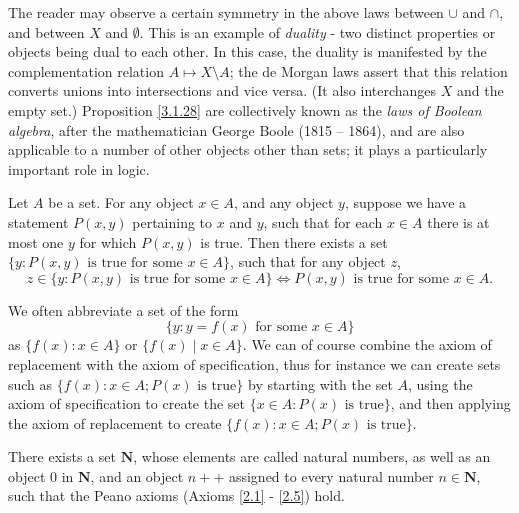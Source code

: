 \begin{remark}\label{3.1.30}
The reader may observe a certain symmetry in the above laws between \(\cup\) and \(\cap\), and between \(X\) and \(\emptyset\).
This is an example of \emph{duality} - two distinct properties or objects being dual to each other.
In this case, the duality is manifested by the complementation relation \(A \mapsto X \setminus A\);
the de Morgan laws assert that this relation converts unions into intersections and vice versa.
(It also interchanges \(X\) and the empty set.)
Proposition \ref{3.1.28} are collectively known as the \emph{laws of Boolean algebra}, after the mathematician George Boole (1815 -- 1864), and are also applicable to a number of other objects other than sets;
it plays a particularly important role in logic.
\end{remark}

\begin{axiom}[Replacement]\label{3.6}
Let \(A\) be a set.
For any object \(x \in A\), and any object \(y\), suppose we have a statement \(P(x, y)\) pertaining to \(x\) and \(y\), such that for each \(x \in A\) there is at most one \(y\) for which \(P(x, y)\) is true.
Then there exists a set \(\{y : P(x, y) \text{ is true for some } x \in A\}\), such that for any object \(z\),
\[
    z \in \{y: P(x, y) \text{ is true for some } x \in A\} \iff P(x, y) \text{ is true for some } x \in A.
\]
\end{axiom}

\begin{note}
We often abbreviate a set of the form
\[
    \{y : y = f(x) \text{ for some } x \in A\}
\]
as \(\{f(x) : x \in A\}\) or \(\{f(x) \mid x \in A\}\).
We can of course combine the axiom of replacement with the axiom of specification, thus for instance we can create sets such as \(\{f(x) : x \in A; P(x) \text{ is true}\}\) by starting with the set \(A\), using the axiom of specification to create the set \(\{x \in A : P(x) \text{ is true}\}\), and then applying the axiom of replacement to create \(\{f(x) : x \in A; P(x) \text{ is true}\}\).
\end{note}

\begin{axiom}[Infinity]\label{3.7}
There exists a set \(\mathbf{N}\), whose elements are called natural numbers, as well as an object \(0\) in \(\mathbf{N}\), and an object \(n++\) assigned to every natural number \(n \in \mathbf{N}\), such that the Peano axioms (Axioms \ref{2.1} - \ref{2.5}) hold.
\end{axiom}

